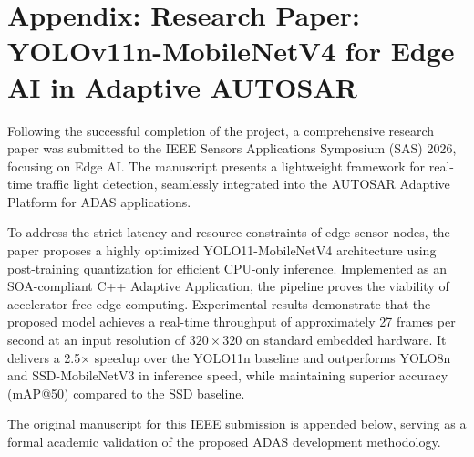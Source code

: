 \chapter*{Appendix: Research Paper: YOLOv11n-MobileNetV4 for Edge AI in Adaptive AUTOSAR}
\label{chap:append}


Following the successful completion of the project, a comprehensive research paper was submitted to the IEEE Sensors Applications Symposium (SAS) 2026, focusing on Edge AI. The manuscript presents a lightweight framework for real-time traffic light detection, seamlessly integrated into the AUTOSAR Adaptive Platform for ADAS applications.

To address the strict latency and resource constraints of edge sensor nodes, the paper proposes a highly optimized YOLO11-MobileNetV4 architecture using post-training quantization for efficient CPU-only inference. Implemented as an SOA-compliant C++ Adaptive Application, the pipeline proves the viability of accelerator-free edge computing. Experimental results demonstrate that the proposed model achieves a real-time throughput of approximately 27 frames per second at an input resolution of $320 \times 320$ on standard embedded hardware. It delivers a 2.5$\times$ speedup over the YOLO11n baseline and outperforms YOLO8n and SSD-MobileNetV3 in inference speed, while maintaining superior accuracy (mAP@50) compared to the SSD baseline.

The original manuscript for this IEEE submission is appended below, serving as a formal academic validation of the proposed ADAS development methodology.


